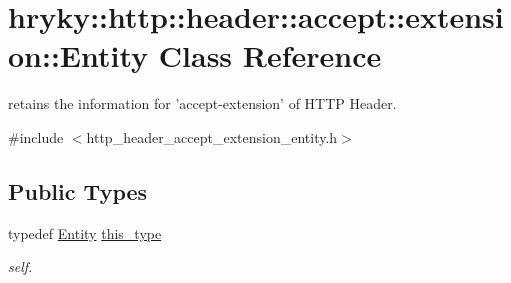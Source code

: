 \hypertarget{classhryky_1_1http_1_1header_1_1accept_1_1extension_1_1_entity}{\section{hryky\-:\-:http\-:\-:header\-:\-:accept\-:\-:extension\-:\-:Entity Class Reference}
\label{classhryky_1_1http_1_1header_1_1accept_1_1extension_1_1_entity}
}


retains the information for 'accept-\/extension' of H\-T\-T\-P Header.  




{\ttfamily \#include $<$http\-\_\-header\-\_\-accept\-\_\-extension\-\_\-entity.\-h$>$}

\subsection*{Public Types}
\begin{DoxyCompactItemize}
\item 
\hypertarget{classhryky_1_1http_1_1header_1_1accept_1_1extension_1_1_entity_af85519f63bfc6a712cf0885ac9d55dbf}{typedef \hyperlink{classhryky_1_1http_1_1header_1_1accept_1_1extension_1_1_entity}{Entity} \hyperlink{classhryky_1_1http_1_1header_1_1accept_1_1extension_1_1_entity_af85519f63bfc6a712cf0885ac9d55dbf}{this\-\_\-type}}\label{classhryky_1_1http_1_1header_1_1accept_1_1extension_1_1_entity_af85519f63bfc6a712cf0885ac9d55dbf}

\begin{DoxyCompactList}\small\item\em self. \end{DoxyCompactList}\end{DoxyCompactItemize}
